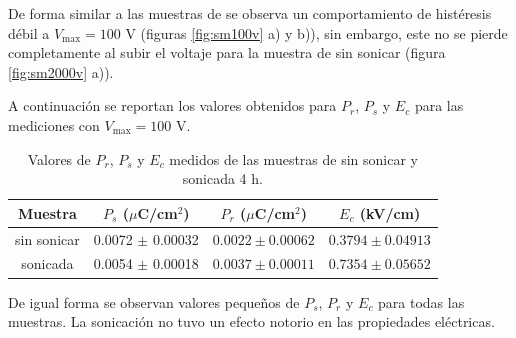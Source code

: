 \documentclass[../main.tex]{subfiles}
\begin{document}
De forma similar a las muestras de \neod{} se observa un comportamiento de histéresis débil a $V_\text{max}=100$ V (figuras \ref{fig:sm100v} a) y b)), sin embargo, este no se pierde completamente al subir el voltaje para la muestra de \sama{} sin sonicar (figura \ref{fig:sm2000v} a)).

A continuación se reportan los valores obtenidos para $P_r$, $P_s$ y $E_c$ para las mediciones con $V_\text{max}=100$ V.

\begin{table}[H]
    \centering
    \begin{tabular}{|c||c|c|c|}
        \hline
        Muestra & $P_s$ ($\mu$C/cm$^2$) & $P_r$ ($\mu$C/cm$^2$) & $E_c$ (kV/cm) \\
        \hline\hline
        \sama{} sin sonicar & 0.0072 $\pm$ 0.00032 & $0.0022 \pm 0.00062$ & $0.3794 \pm 0.04913$ \\
        \hline
        \sama{} sonicada & 0.0054 $\pm$ 0.00018 & $0.0037 \pm 0.00011$ & $0.7354 \pm 0.05652$ \\
        \hline
        \end{tabular} 
        \caption{Valores de $P_r$, $P_s$ y $E_c$ medidos de las muestras de \sama{} sin sonicar y sonicada 4 h.}
    \label{tabla:respolarsama}
\end{table}
De igual forma se observan valores pequeños de $P_s$, $P_r$ y $E_c$ para todas las muestras. La sonicación no tuvo un efecto notorio en las propiedades eléctricas.
\end{document}
